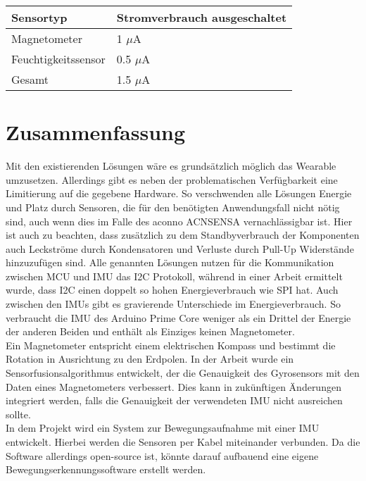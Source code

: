 \begin{minipage}{\linewidth}
	\label{tab:cmp_arduino_primo}
	\begin{tabularx}{\linewidth}{X|X}
		Sensortyp & Stromverbrauch ausgeschaltet\\
		\hline
    Magnetometer & 1 $\mu$A \cite{datasheet_lis3mdl}\\
    Feuchtigkeitssensor & 0.5 $\mu$A \cite{datasheet_hts221}\\
    \hline
    Gesamt & 1.5 $\mu$A\\
	\end{tabularx}
\end{minipage}

\section{Zusammenfassung}
Mit den existierenden Lösungen wäre es grundsätzlich möglich das Wearable umzusetzen.
Allerdings gibt es neben der problematischen Verfügbarkeit eine Limitierung auf die gegebene Hardware.
So verschwenden alle Lösungen Energie und Platz durch Sensoren, die für den benötigten Anwendungsfall nicht nötig sind, auch wenn dies im Falle des aconno ACNSENSA vernachlässigbar ist.
Hier ist auch zu beachten, dass zusätzlich zu dem Standbyverbrauch der Komponenten auch Leckströme durch Kondensatoren und Verluste durch Pull-Up Widerstände hinzuzufügen sind.
Alle genannten Lösungen nutzen für die Kommunikation zwischen MCU und IMU das I2C Protokoll, während in einer Arbeit \cite{comparison_i2c_spi} ermittelt wurde, dass I2C einen doppelt so hohen Energieverbrauch wie SPI hat.
Auch zwischen den IMUs gibt es gravierende Unterschiede im Energieverbrauch.
So verbraucht die IMU des Arduino Prime Core weniger als ein Drittel der Energie der anderen Beiden und enthält als Einziges keinen Magnetometer.\\
Ein Magnetometer entspricht einem elektrischen Kompass und bestimmt die Rotation in Ausrichtung zu den Erdpolen.
In der Arbeit \cite{sensor_fusion} wurde ein Sensorfusionsalgorithmus entwickelt, der die Genauigkeit des Gyrosensors mit den Daten eines Magnetometers verbessert.
Dies kann in zukünftigen Änderungen integriert werden, falls die Genauigkeit der verwendeten IMU nicht ausreichen sollte.\\
In dem Projekt \cite{project_chordata} wird ein System zur Bewegungsaufnahme mit einer IMU entwickelt.
Hierbei werden die Sensoren per Kabel miteinander verbunden.
Da die Software allerdings open-source ist, könnte darauf aufbauend eine eigene Bewegungserkennungssoftware erstellt werden.
